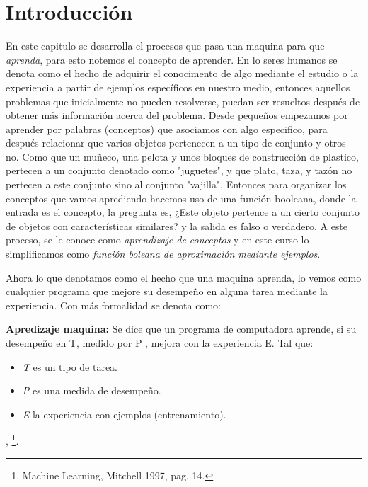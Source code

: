 \section{Introducción}

En este capitulo se desarrolla el procesos que pasa una maquina para que \emph{aprenda}, para esto notemos el concepto de aprender. En lo seres humanos se denota como el hecho de adquirir el conocimento de algo mediante el estudio o la experiencia a partir de ejemplos específicos en nuestro medio, entonces aquellos problemas que inicialmente no pueden resolverse, puedan ser resueltos después de obtener más información acerca del problema. Desde pequeños empezamos por aprender por palabras (conceptos) que asociamos con algo especifico, para después relacionar que varios objetos pertenecen a un tipo de conjunto y otros no. Como que un muñeco, una pelota y unos bloques de construcción de plastico, pertecen a un conjunto denotado como "juguetes", y que plato, taza, y tazón no pertecen a este conjunto sino al conjunto "vajilla". Entonces para organizar los conceptos que vamos aprediendo hacemos uso de una función booleana, donde la entrada es el concepto, la pregunta es, ¿Este objeto pertence a un cierto conjunto de objetos con características similares? y la salida es falso o verdadero. A este proceso, se le conoce como \emph{aprendizaje de conceptos} y en este curso lo simplificamos como \emph{función boleana de aproximación mediante ejemplos}.

Ahora lo que denotamos como el hecho que una maquina aprenda, lo vemos como cualquier programa que mejore su desempeño en alguna tarea mediante la experiencia. Con más formalidad se denota como:

\begin{definition}
 \textbf{Apredizaje maquina:} Se dice que un programa de computadora aprende, si su desempeño en T, medido por P , mejora con la experiencia E. Tal que: 

 \begin{itemize}
  \item \emph{T} es un tipo de tarea.
  \item \emph{P} es una medida de desempeño.
  \item \emph{E} la experiencia con ejemplos (entrenamiento).  
 \end{itemize}

 , \footnote{Machine Learning, Mitchell 1997, pag. 14.}.
\end{definition}

